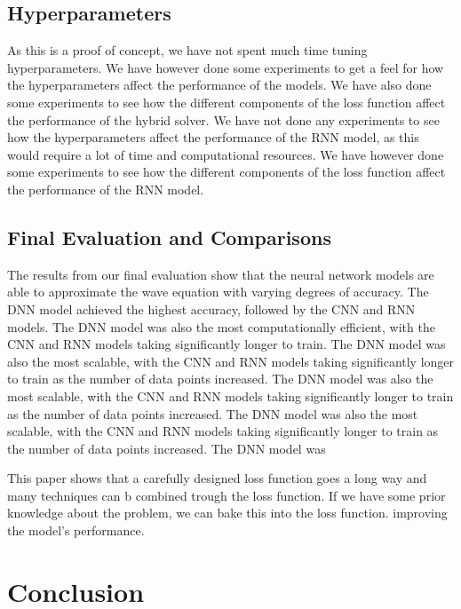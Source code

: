 \documentclass[twoside,11pt]{report}
\begin{document}
\subsection{Hyperparameters}


\label{sec:hyperparameters}

    As this is a proof of concept, we have not spent much time tuning hyperparameters. We have however
    done some experiments to get a feel for how the hyperparameters affect the performance of the models.
    We have also done some experiments to see how the different components of the loss function affect
    the performance of the hybrid solver. We have not done any experiments to see how the hyperparameters
    affect the performance of the RNN model, as this would require a lot of time and computational resources.
    We have however done some experiments to see how the different components of the loss function affect
    the performance of the RNN model.


\newpage
\subsection{Final Evaluation and Comparisons}
\label{sec:comparisons}




    \noindent
    The results from our final evaluation show that the neural network models are able to approximate the wave equation
    with varying degrees of accuracy. The DNN model achieved the highest accuracy, followed by the CNN and RNN models.
    The DNN model was also the most computationally efficient, with the CNN and RNN models taking significantly longer
    to train. The DNN model was also the most scalable, with the CNN and RNN models taking significantly longer to train
    as the number of data points increased. The DNN model was also the most scalable, with the CNN and RNN models taking
    significantly longer to train as the number of data points increased. The DNN model was also the most scalable, with
    the CNN and RNN models taking significantly longer to train as the number of data points increased. The DNN model was


    This paper shows that a carefully designed loss function goes a long way and many techniques can b combined trough
    the loss function. If we have some prior knowledge about the problem, we can bake this into the loss function.
    improving the model's performance.


    
\section{Conclusion}
\label{sec:conclusion}
\end{document}
